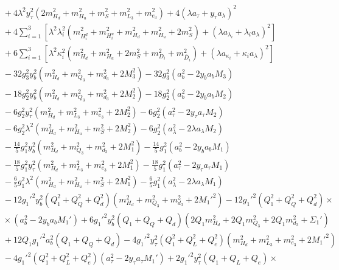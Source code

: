 \documentclass[preprint,amsmath,amssymb,aps,superscriptaddress,prd,showpacs,floatfix,nofootinbib]{revtex4-1}
\begin{document}
\begin{subequations}
\begin{align}
&{}+4\lambda^2y_\tau^2\left ( 2m_{H_d}^2+m_{H_u}^2+m_S^2+m_{L_3}^2+m_{e_3}^2\right )+4\left ( \lambda a_\tau + y_\tau a_\lambda\right )^2\nonumber\\
&{}+4\sum_{i=1}^3\left [ \lambda^2\lambda_i^2\left ( m_{H_i^d}^2+m_{H_i^u}^2+m_{H_d}^2+m_{H_u}^2+2m_S^2\right )+\left ( \lambda a_{\lambda_i}+\lambda_i a_\lambda\right )^2\right ]\nonumber\\
&{}+6\sum_{i=1}^3\left [ \lambda^2\kappa_i^2\left ( m_{H_d}^2+m_{H_u}^2+2m_S^2+m_{D_i}^2+m_{\overline{D}_i}^2\right )+\left ( \lambda a_{\kappa_i}+\kappa_i a_\lambda\right )^2\right ]\nonumber\\
&{}-32g_3^2y_b^2\left ( m_{H_d}^2+m_{Q_3}^2+m_{d_3}^2+2M_3^2\right )-32g_3^2\left ( a_b^2-2y_ba_bM_3\right )\nonumber\\
&{}-18g_2^2y_b^2\left ( m_{H_d}^2+m_{Q_3}^2+m_{d_3}^2+2M_2^2\right )-18g_2^2\left ( a_b^2-2y_ba_bM_2\right )\nonumber\\
&{}-6g_2^2y_\tau^2\left ( m_{H_d}^2+m_{L_3}^2+m_{e_3}^2+2M_2^2\right )-6g_2^2\left ( a_\tau^2-2y_\tau a_\tau M_2\right )\nonumber\\
&{}-6g_2^2\lambda^2\left ( m_{H_d}^2+m_{H_u}^2+m_S^2+2M_2^2\right )-6g_2^2\left ( a_\lambda^2-2\lambda a_\lambda M_2\right )\nonumber\\
&{}-\frac{14}{5}g_1^2y_b^2\left ( m_{H_d}^2+m_{Q_3}^2+m_{d_3}^2+2M_1^2\right )-\frac{14}{5}g_1^2\left ( a_b^2-2y_ba_bM_1\right )\nonumber\\
&{}-\frac{18}{5}g_1^2y_\tau^2\left ( m_{H_d}^2+m_{L_3}^2+m_{e_3}^2+2M_1^2\right )-\frac{18}{5}g_1^2\left ( a_\tau^2-2y_\tau a_\tau M_1\right )\nonumber\\
&{}-\frac{6}{5}g_1^2\lambda^2\left ( m_{H_d}^2+m_{H_u}^2+m_S^2+2M_1^2\right )-\frac{6}{5}g_1^2\left ( a_\lambda^2-2\lambda a_\lambda M_1\right )\nonumber\\
&{}-12g_1'^2y_b^2\left ( Q_1^2+Q_Q^2+Q_d^2\right )\left ( m_{H_d}^2+m_{Q_3}^2+m_{d_3}^2+2M_1'^2\right )-12g_1'^2\left ( Q_1^2+Q_Q^2+Q_d^2\right )\times\nonumber\\
&{}\times\left ( a_b^2-2y_b a_b M_1'\right )+6g_1'^2y_b^2\left ( Q_1+Q_Q+Q_d\right )\left ( 2Q_1m_{H_d}^2+2Q_1m_{Q_3}^2+2Q_1m_{d_3}^2+\Sigma_1'\right )\nonumber\\
&{}+12Q_1g_1'^2a_b^2\left ( Q_1+Q_Q+Q_d\right )-4g_1'^2y_\tau^2\left ( Q_1^2+Q_L^2+Q_e^2\right )\left ( m_{H_d}^2+m_{L_3}^2+m_{e_3}^2+2M_1'^2\right )\nonumber\\
&{}-4g_1'^2\left ( Q_1^2+Q_L^2+Q_e^2\right )\left ( a_\tau^2-2y_\tau a_\tau M_1'\right )+2g_1'^2y_\tau^2\left ( Q_1+Q_L+Q_e\right )\times\nonumber\\

\end{align}
\end{subequations}
\end{document}
